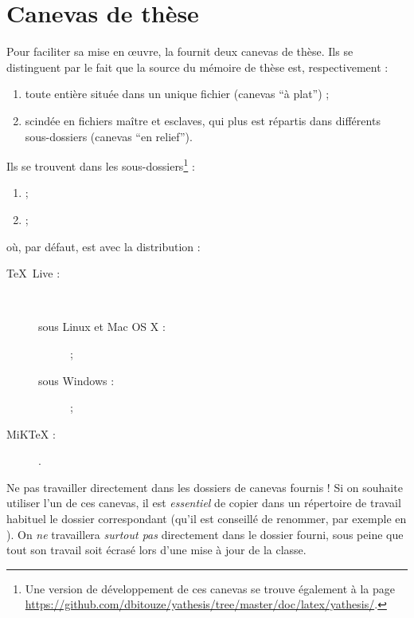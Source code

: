 \chapter{Canevas de thèse}\label{cha:canevas}

Pour faciliter sa mise en œuvre, la \yatcl fournit deux canevas de thèse. Ils
se distinguent par le fait que la source  du mémoire de thèse est,
respectivement :
\begin{enumerate}
\item toute entière située dans un unique fichier (canevas \enquote{à plat}) ;
\item scindée en fichiers maître et esclaves, qui plus est répartis dans
  différents sous-dossiers (canevas \enquote{en relief}).
\end{enumerate}
Ils se trouvent dans les sous-dossiers\footnote{Une version de
  développement de ces canevas se trouve également à la page
  \url{https://github.com/dbitouze/yathesis/tree/master/doc/latex/yathesis/}.} :
\begin{enumerate}
\item {} ;
\item {} ;
\end{enumerate}
où, par défaut,  est avec la distribution :
\begin{description}
\item[\TeX{}~Live :]\
  \begin{description}
  \item[sous Linux et Mac OS X :] \unixtldirectory\tldistdirectory\versiontl ;
  \item[sous Windows :] \wintldirectory\tldistdirectory\versiontl ;
  \end{description}
\item[MiK\TeX{} :] \miktexdistdirectory.
\end{description}

\begin{dbwarning}{Ne pas travailler directement dans les dossiers de canevas
    fournis !}{}
  Si on souhaite utiliser l'un de ces canevas, il est \emph{essentiel} de
  copier dans un répertoire de travail habituel le dossier correspondant (qu'il
  est conseillé de renommer, par exemple en \directory{these}). On \emph{ne}
  travaillera \emph{surtout pas} directement dans le dossier fourni, sous peine
  que tout son travail soit écrasé lors d'une mise à jour de la classe.
\end{dbwarning}

